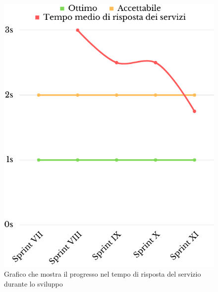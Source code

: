 \begin{figure}[H]
	\centering
	\includegraphics[scale=0.35]{img/tempo_di_risposta.png}
	\caption{Grafico che mostra il progresso nel tempo di risposta del servizio durante lo sviluppo}
\end{figure}
